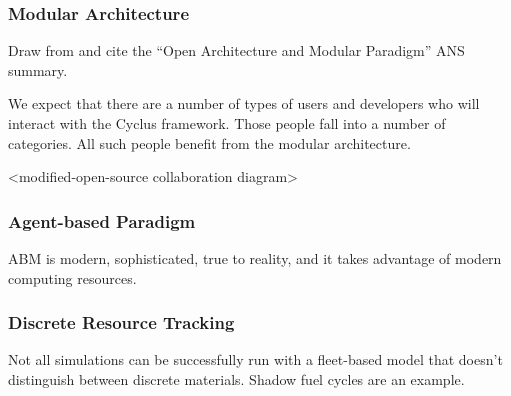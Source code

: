 \subsubsection{Modular Architecture}

Draw from and cite the ``Open Architecture and Modular Paradigm'' ANS summary.

We expect that there are a number of types of users and developers who will 
interact with the Cyclus framework. Those people fall into a number of 
categories. All such people benefit from the modular architecture. 

<modified-open-source collaboration diagram>

\subsubsection{Agent-based Paradigm}

ABM is modern, sophisticated, true to reality, and it takes advantage of modern 
computing resources. 


\subsubsection{Discrete Resource Tracking}

Not all simulations can be successfully run with a fleet-based model that 
doesn't distinguish between discrete materials. Shadow fuel cycles are an 
example. 

